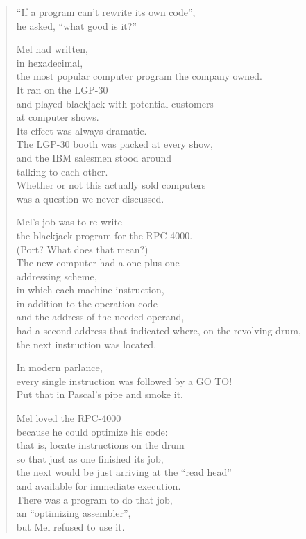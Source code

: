 \documentclass[10pt,twoside,openright]{memoir}
\begin{document}
{\begin{verse}
``If a program can't rewrite its own code'', \\
he asked, ``what good is it?''

Mel had written, \\
in hexadecimal, \\
the most popular computer program the company owned. \\
It ran on the LGP-30 \\
and played blackjack with potential customers \\
at computer shows. \\
Its effect was always dramatic. \\
The LGP-30 booth was packed at every show, \\
and the IBM salesmen stood around \\
talking to each other. \\
Whether or not this actually sold computers \\
was a question we never discussed.

Mel's job was to re-write \\
the blackjack program for the RPC-4000. \\
(Port?  What does that mean?) \\
The new computer had a one-plus-one \\
addressing scheme, \\
in which each machine instruction, \\
in addition to the operation code \\
and the address of the needed operand, \\
had a second address that indicated where, on the revolving drum, \\
the next instruction was located.

In modern parlance, \\
every single instruction was followed by a GO TO! \\
Put that in Pascal's pipe and smoke it.

Mel loved the RPC-4000 \\
because he could optimize his code: \\
that is, locate instructions on the drum \\
so that just as one finished its job, \\
the next would be just arriving at the ``read head'' \\
and available for immediate execution. \\
There was a program to do that job, \\
an ``optimizing assembler'', \\
but Mel refused to use it.


\end{verse}}
\end{document}
